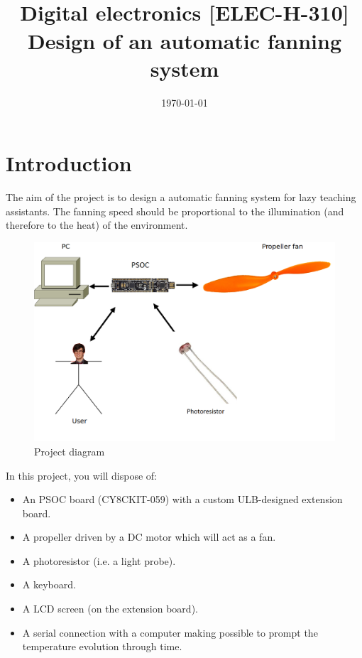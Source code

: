 \documentclass[11pt,a4paper]{article}
\date{\vspace{-1.7cm}\mydate\today}
\title{\vspace{-2cm} \labonumber\\ Digital electronics [ELEC-H-310]\\Design of an automatic fanning system\ifthenelse{\boolean{corrige}}{~\\Corrigé}{}}
\theoremstyle{definition}%
\begin{document}
\pagestyle{empty}
\maketitle



\section{Introduction}
The aim of the project is to design a automatic fanning system for lazy teaching assistants. The fanning speed should be proportional to the illumination (and therefore to the heat) of the environment. 

\begin{center}
\begin{figure}[H]
\includegraphics[width=\textwidth]{workflow}
\caption{Project diagram}
\label{fig:workflow}
\end{figure}
\end{center}

In this project, you will dispose of:
\begin{itemize}
	\item An PSOC board (CY8CKIT-059) with a custom ULB-designed extension board. 
	\item A propeller driven by a DC motor which will act as a fan. 
	\item A photoresistor (i.e. a light probe).
	\item A keyboard.
	\item A LCD screen (on the extension board).
	\item A serial connection with a computer making possible to prompt the temperature evolution through time.
\end{itemize}
\end{document}
